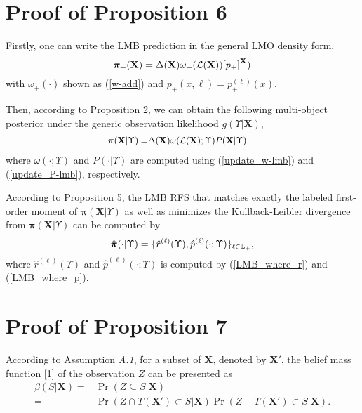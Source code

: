 \documentclass[journal]{IEEEtran}
\newcommand{\bX}{{\mathbf X}}
\newcommand{\bpi}{{\boldsymbol\pi}}
\begin{document}
{\section{Proof of Proposition 6}
Firstly, one can write the LMB prediction  in the general LMO density form,
\begin{equation}\label{LMP-LMO}
{\small
\bpi_+(\bX)=\Delta(\bX)\omega_+(\mathcal{L}(\bX)){[p_+]}^\bX)}
\end{equation}
with $\omega_+(\cdot)$  shown as (\ref{w-add}) and $p_+(x,\ell)=p_+^{(\ell)}(x)$.


Then, according to Proposition 2,   we can obtain the following multi-object posterior under the generic observation likelihood $g(\Upsilon|\bX)$,
\begin{equation}\label{update_equation}
{\small
\begin{split}
  \bpi(\bX|\Upsilon)
=&\Delta(\bX)\omega(\mathcal{L}(\bX);\Upsilon)P(\bX|\Upsilon)
\end{split}}
\end{equation}
where  $\omega(\cdot;\Upsilon)$ and $P(\cdot|\Upsilon)$ are computed  using (\ref{update_w-lmb}) and (\ref{update_P-lmb}), respectively.

According to Proposition 5, the LMB RFS that matches exactly the labeled first-order moment of $\bpi(\bX|\Upsilon)$ as well as minimizes the Kullback-Leibler divergence  from  $\bpi(\bX|\Upsilon)$ can be computed by
 \begin{equation}
 {\small
 \hat\bpi(\cdot|\Upsilon)=\{\hat r^{(\ell)}(\Upsilon),\hat p^{(\ell)}(\cdot;\Upsilon)\}_{\ell\in\mathbb{L}_+},}\end{equation}
where $\hat r^{(\ell)}(\Upsilon)$ and $\hat p^{(\ell)}(\cdot;\Upsilon)$ is computed by (\ref{LMB_where_r}) and (\ref{LMB_where_p}).
\section{Proof of Proposition 7}
According to Assumption \textit{A.1}, for a subset of $\bX$, denoted by $\bX'$, the belief mass function [1] of the observation $Z$ can be presented as
\begin{equation}\label{belief-mass-function}
\begin{split}
\beta(S|\bX)=&\Pr(Z\subseteq S|\bX)\\
=&\Pr(Z\cap T(\bX')\subset S|\bX)\Pr(Z- T(\bX')\subset S|\bX).
\end{split}
\end{equation}

}
\end{document}
